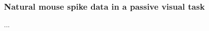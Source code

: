 \subsubsection{Natural mouse spike data in a passive visual task}
\label{subsection:allen_dataset}

...